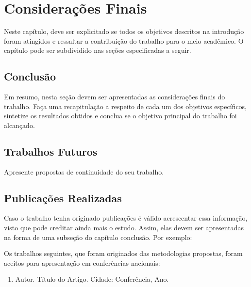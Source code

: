 \chapter{Considerações Finais} \label{consideracoes}

Neste capítulo, deve ser explicitado se todos os objetivos descritos na introdução foram atingidos e ressaltar a contribuição do trabalho para o meio acadêmico. O capítulo pode ser subdividido nas seções especificadas a seguir. 



\section{Conclusão}\label{conclusao}

Em resumo, nesta seção devem ser apresentadas as considerações finais do trabalho. Faça uma recapitulação a respeito de cada um dos objetivos específicos, sintetize os resultados obtidos e conclua se o objetivo principal do trabalho foi alcançado.


\section{Trabalhos Futuros}\label{trabalhosFuturos}

Apresente propostas de continuidade do seu trabalho.

\section{Publicações Realizadas}\label{publicacoes}

Caso o trabalho tenha originado publicações é válido acrescentar essa informação, visto que pode creditar ainda mais o estudo. Assim, elas devem ser apresentadas na forma de uma subseção do capítulo conclusão. Por exemplo: 

Os trabalhos seguintes, que foram originados das metodologias propostas, foram aceitos para apresentação em conferências nacionais:

\begin{enumerate}
   \item Autor. Título do Artigo. Cidade: Conferência, Ano.
 \end{enumerate}

